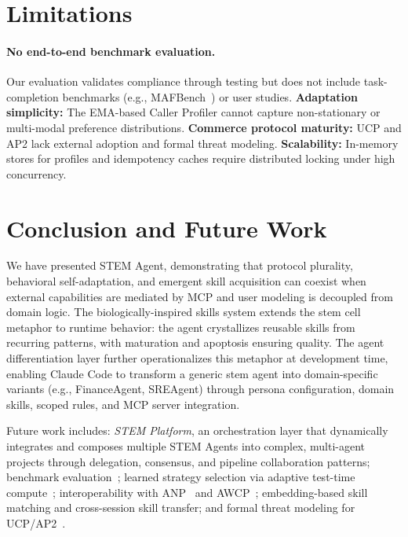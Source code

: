 \documentclass{article}
\begin{document}
\section{Limitations}
\label{sec:limitations}

\paragraph{No end-to-end benchmark evaluation.} Our evaluation validates compliance through testing but does not include task-completion benchmarks (e.g., MAFBench~\citep{orogat2026mafbench}) or user studies. \textbf{Adaptation simplicity:} The EMA-based Caller Profiler cannot capture non-stationary or multi-modal preference distributions. \textbf{Commerce protocol maturity:} UCP and AP2 lack external adoption and formal threat modeling. \textbf{Scalability:} In-memory stores for profiles and idempotency caches require distributed locking under high concurrency.

\section{Conclusion and Future Work}
\label{sec:conclusion}

We have presented STEM Agent, demonstrating that protocol plurality, behavioral self-adaptation, and emergent skill acquisition can coexist when external capabilities are mediated by MCP and user modeling is decoupled from domain logic. The biologically-inspired skills system extends the stem cell metaphor to runtime behavior: the agent crystallizes reusable skills from recurring patterns, with maturation and apoptosis ensuring quality. The agent differentiation layer further operationalizes this metaphor at development time, enabling Claude Code to transform a generic stem agent into domain-specific variants (e.g., FinanceAgent, SREAgent) through persona configuration, domain skills, scoped rules, and MCP server integration.

Future work includes: \emph{STEM Platform}, an orchestration layer that dynamically integrates and composes multiple STEM Agents into complex, multi-agent projects through delegation, consensus, and pipeline collaboration patterns; benchmark evaluation~\citep{orogat2026mafbench, luo2025mcpuniverse}; learned strategy selection via adaptive test-time compute~\citep{alomrani2025reasoning}; interoperability with ANP~\citep{chang2025anp} and AWCP~\citep{nie2026awcp}; embedding-based skill matching and cross-session skill transfer; and formal threat modeling for UCP/AP2~\citep{shen2026mcp38, anbiaee2026security}.
\end{document}
